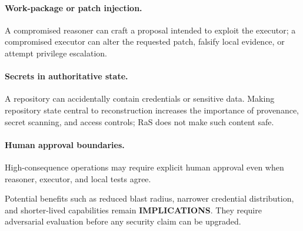 \paragraph{Work-package or patch injection.}
A compromised reasoner can craft a proposal intended to exploit the executor; a compromised executor can alter the requested patch, falsify local evidence, or attempt privilege escalation.

\paragraph{Secrets in authoritative state.}
A repository can accidentally contain credentials or sensitive data. Making repository state central to reconstruction increases the importance of provenance, secret scanning, and access controls; RaS does not make such content safe.

\paragraph{Human approval boundaries.}
High-consequence operations may require explicit human approval even when reasoner, executor, and local tests agree.

Potential benefits such as reduced blast radius, narrower credential distribution, and shorter-lived capabilities remain \textbf{IMPLICATIONS}. They require adversarial evaluation before any security claim can be upgraded.
